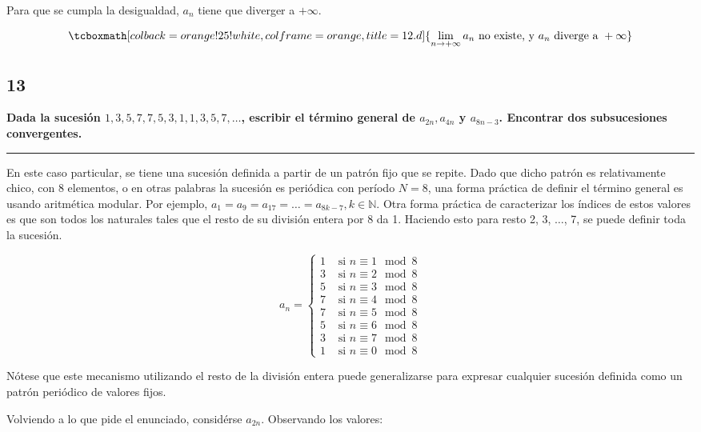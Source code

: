 \documentclass{article}
\newcommand{\hresult}[2]{\tcboxmath[colback=orange!25!white,colframe=orange, title=#1] {#2} }
\newcommand{\subsectionx}[1]{\subsection*{#1}\label{subsec:#1}\addcontentsline{toc}{subsection}{\nameref{subsec:#1}}}
\newcommand{\limninf}{\lim_{n \rightarrow +\infty}}
\begin{document}
Para que se cumpla la desigualdad, $ a_n $ tiene que diverger a $ +\infty $.

\begin{equation}
\hresult{12.d}{ \limninf a_n \text{ no existe, y } a_n \text{ diverge a } +\infty }
\end{equation}

\subsectionx{13}

\textbf{ Dada la sucesión $1, 3, 5, 7, 7, 5, 3, 1, 1, 3, 5, 7, \dots $, escribir el término general de $ a_{2n}, a_{4n} $ y $ a_{8n-3} $. Encontrar dos subsucesiones convergentes. }

\vspace{1em}
\hrule
\vspace{1em}

En este caso particular, se tiene una sucesión definida a partir de un patrón fijo que se repite. Dado que dicho patrón es relativamente chico, con 8 elementos, o en otras palabras la sucesión es periódica con período $ N = 8 $, una forma práctica de definir el término general es usando aritmética modular. Por ejemplo, $ a_1 = a_9 = a_{17} = \dots = a_{8k-7}, k \in \mathbb{N} $. Otra forma práctica de caracterizar los índices de estos valores es que son todos los naturales tales que el resto de su división entera por 8 da 1. Haciendo esto para resto 2, 3, $ \dots $, 7, se puede definir toda la sucesión.

\begin{equation}
a_n = 
	\begin{cases}
		1 & \text{ si } n \equiv 1 \mod 8 \\
		3 & \text{ si } n \equiv 2 \mod 8 \\
		5 & \text{ si } n \equiv 3 \mod 8 \\
		7 & \text{ si } n \equiv 4 \mod 8 \\
		7 & \text{ si } n \equiv 5 \mod 8 \\
		5 & \text{ si } n \equiv 6 \mod 8 \\
		3 & \text{ si } n \equiv 7 \mod 8 \\
		1 & \text{ si } n \equiv 0 \mod 8
	\end{cases}
\end{equation}

Nótese que este mecanismo utilizando el resto de la división entera puede generalizarse para expresar cualquier sucesión definida como un patrón periódico de valores fijos.

Volviendo a lo que pide el enunciado, considérse $ a_{2n} $. Observando los valores:
\end{document}
